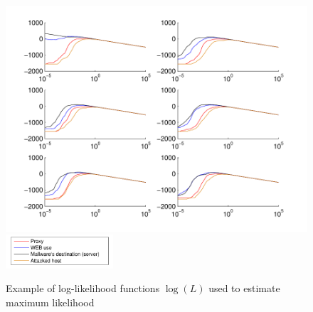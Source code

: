 \documentclass[a4paper]{IEEEtran}
\begin{document}
\begin{figure}[t!]%
  \centering
  \includegraphics[width=140mm]{loglik_src_bdivp}
  \includegraphics[width=40mm]{legend}
    \caption{Example of log-likelihood functions $\log(L)$ used to estimate maximum likelihood}
  \label{fig:loglik_src_bdivp}
\end{figure}



\end{document}
